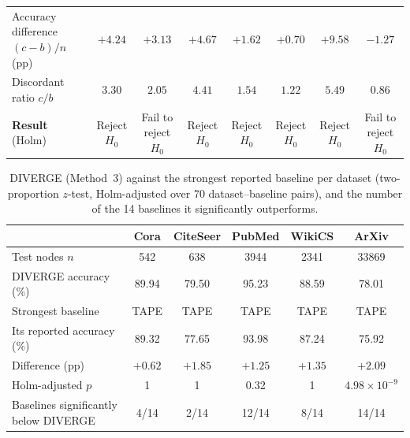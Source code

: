 \documentclass[a4paper,fleqn]{cas-sc}
\newcommand{\revthree}[1]{\textcolor{revgreen}{#1}} %
\begin{document}
\begin{table}[h]
\begin{tabular*}{\textwidth}{@{\extracolsep{\fill}} lccccccc @{}}
\revthree{Accuracy difference $(c-b)/n$ (pp)} & \revthree{$+4.24$} & \revthree{$+3.13$} & \revthree{$+4.67$} & \revthree{$+1.62$} & \revthree{$+0.70$} & \revthree{$+9.58$} & \revthree{$-1.27$} \\
\revthree{Discordant ratio $c/b$} & \revthree{$3.30$} & \revthree{$2.05$} & \revthree{$4.41$} & \revthree{$1.54$} & \revthree{$1.22$} & \revthree{$5.49$} & \revthree{$0.86$} \\
\midrule
\textbf{Result} \revthree{(Holm)} & \revthree{Reject $H_0$} & \revthree{Fail to reject $H_0$} & \revthree{Reject $H_0$} & \revthree{Reject $H_0$} & \revthree{Reject $H_0$} & \revthree{Reject $H_0$} & \revthree{Fail to reject $H_0$} \\
\bottomrule
\end{tabular*}
\end{table}

\begin{table}[htbp]
\centering\color{revshared}
\caption{DIVERGE (Method~3) against the strongest reported baseline per dataset (two-proportion $z$-test, Holm-adjusted over 70 dataset--baseline pairs), and the number of the 14 baselines it significantly outperforms.}
\label{tab:significance_reported}
\small
\setlength{\tabcolsep}{3pt}
\begin{tabular*}{\textwidth}{@{\extracolsep{\fill}} lccccc @{}}
\toprule
 & \textbf{Cora} & \textbf{CiteSeer} & \textbf{PubMed} & \textbf{WikiCS} & \textbf{ArXiv} \\
\midrule
Test nodes $n$                    & 542 & 638 & 3944 & 2341 & 33869 \\
DIVERGE accuracy (\%)             & 89.94 & 79.50 & 95.23 & 88.59 & 78.01 \\
Strongest baseline                & TAPE & TAPE & TAPE & TAPE & TAPE \\
Its reported accuracy (\%)        & 89.32 & 77.65 & 93.98 & 87.24 & 75.92 \\
Difference (pp)                   & $+0.62$ & $+1.85$ & $+1.25$ & $+1.35$ & $+2.09$ \\
Holm-adjusted $p$                 & 1 & 1 & 0.32 & 1 & $4.98\times10^{-9}$ \\
Baselines significantly below DIVERGE & 4/14 & 2/14 & 12/14 & 8/14 & 14/14 \\
\bottomrule
\end{tabular*}
\end{table}
\end{document}
